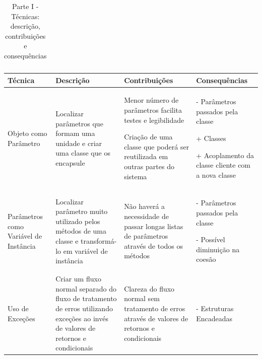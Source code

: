 \begin{landscape}
\begin{table}[hbt]
\begin{tabular}{|p{3.5cm}|p{5cm}|p{8.5cm}|p{7.2cm}|}
\hline
\end{tabular}
\caption{Parte I - Técnicas: descrição, contribuições e consequências}
\end{table}


\begin{table}[hbt]
\begin{tabular}{|p{3.5cm}|p{5cm}|p{8.5cm}|p{7.2cm}|}
\hline 
\textbf{Técnica} & \textbf{Descrição} & \textbf{Contribuições} & \textbf{Consequências} \tabularnewline
\hline

\hline
Objeto como Parâmetro
& Localizar parâmetros que formam uma unidade e criar uma classe que os encapsule
& \begin{my_itemize}
	\item Menor número de parâmetros facilita testes e legibilidade
	\item Criação de uma classe que poderá ser reutilizada em outras partes do sistema
  \end{my_itemize}
& \begin{my_itemize}
	\item[-] Parâmetros passados pela classe
	\item[+] Classes
	\item[+] Acoplamento da classe cliente com a nova classe
  \end{my_itemize}
\tabularnewline

\hline
Parâmetros como Variável de Instância
& Localizar parâmetro muito utilizado pelos métodos de uma classe e transformá-lo em variável de instância
& \begin{my_itemize}
	\item Não haverá a necessidade de passar longas listas de parâmetros através de todos os métodos
  \end{my_itemize}
& \begin{my_itemize}
	\item[-] Parâmetros passados pela classe
	\item[-] Possível diminuição na coesão
  \end{my_itemize}
\tabularnewline

\hline
Uso de Exceções
& Criar um fluxo normal separado do fluxo de tratamento de erros utilizando exceções ao invés de valores de retornos e condicionais
& \begin{my_itemize}
	\item Clareza do fluxo normal sem tratamento de erros através de valores de retornos e condicionais
  \end{my_itemize}
& \begin{my_itemize}
	\item[-] Estruturas Encadeadas
  \end{my_itemize}
\tabularnewline


\end{tabular}
\end{table}
\end{landscape}
